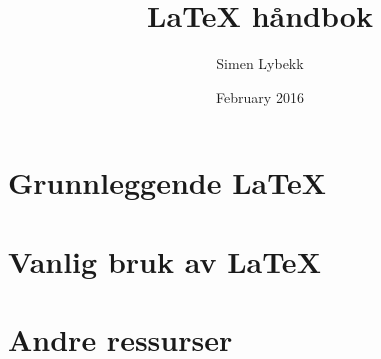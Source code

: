 \documentclass{article}
\author{Simen Lybekk}
\title{LaTeX håndbok}
\date{February 2016}
\begin{document}
\maketitle

\tableofcontents
\clearpage


\section{Grunnleggende LaTeX}


\section{Vanlig bruk av LaTeX}



\section{Andre ressurser}



\end{document}
